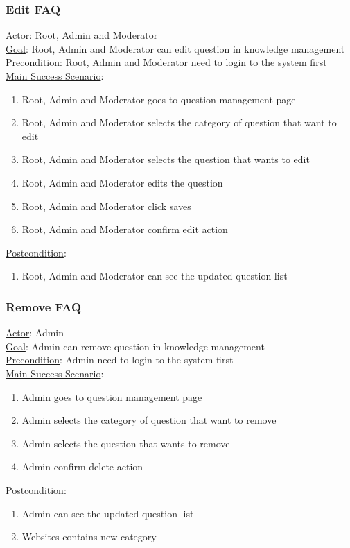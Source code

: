 \documentclass[12pt,oneside,openright,a4paper]{cpe-english-project}
\begin{document}
	\subsubsection{Edit FAQ}
	\underline{Actor}: Root, Admin and Moderator\\
	\underline{Goal}: Root, Admin and Moderator can edit question in knowledge management\\
	\underline{Precondition}: Root, Admin and Moderator need to login to the system first\\
	\underline{Main Success Scenario}:
	\begin{enumerate}[label={\arabic*.}]
		\item Root, Admin and Moderator goes to question management page
		\item Root, Admin and Moderator selects the category of question that want to edit
		\item Root, Admin and Moderator selects the question that wants to edit
		\item Root, Admin and Moderator edits the question
		\item Root, Admin and Moderator click saves
		\item Root, Admin and Moderator confirm edit action
	\end{enumerate}
	\underline{Postcondition}: 
	\begin{enumerate}[label={\arabic*.}]
		\item Root, Admin and Moderator can see the updated question list
	\end{enumerate}

	\subsubsection{Remove FAQ}
	\underline{Actor}: Admin\\
	\underline{Goal}: Admin can remove question in knowledge management\\
	\underline{Precondition}: Admin need to login to the system first\\
	\underline{Main Success Scenario}:
	\begin{enumerate}[label={\arabic*.}]
		\item Admin goes to question management page
		\item Admin selects the category of question that want to remove
		\item Admin selects the question that wants to remove
		\item Admin confirm delete action
	\end{enumerate}
	\underline{Postcondition}: 
	\begin{enumerate}[label={\arabic*.}]
		\item Admin can see the updated question list
		\item Websites contains new category
	\end{enumerate}
\end{document}

